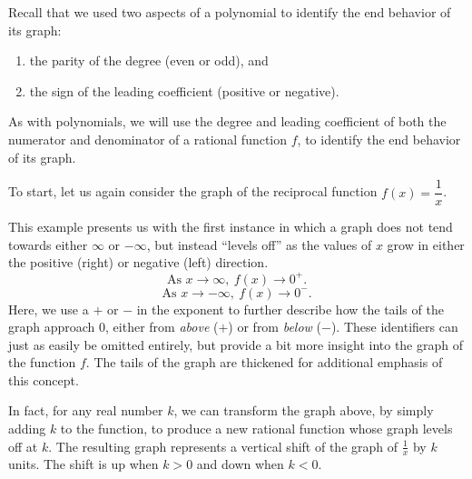 \documentclass[12pt]{book}
\theoremstyle{definition}
\begin{document}
Recall that we used two aspects of a polynomial to identify the end behavior of its graph:
\begin{enumerate}
	\item the parity of the degree (even or odd), and
	\item the sign of the leading coefficient (positive or negative).
\end{enumerate}
As with polynomials, we will use the degree and leading coefficient of both the numerator and denominator of a rational function $f$, to identify the end behavior of its graph.
\par
To start, let us again consider the graph of the reciprocal function $f(x)=\dfrac{1}{x}$.
\newpage
\begin{multicols}{2}

\columnbreak

This example presents us with the first instance in which a graph does not tend towards either $\infty$ or $-\infty$, but instead ``levels off'' as the values of $x$ grow in either the positive (right) or negative (left) direction.
$$\text{As } x\rightarrow\infty,\ f(x)\rightarrow 0^+.$$
$$\text{As } x\rightarrow-\infty,\ f(x)\rightarrow 0^-.$$
Here, we use a $+$ or $-$ in the exponent to further describe how the tails of the graph approach $0$, either from \textit{above} ($+$) or from \textit{below} ($-$).  These identifiers can just as easily be omitted entirely, but provide a bit more insight into the graph of the function $f$.  The tails of the graph are thickened for additional emphasis of this concept.
\end{multicols}
In fact, for any real number $k$, we can transform the graph above, by simply adding $k$ to the function, to produce a new rational function whose graph levels off at $k$.  The resulting graph represents a vertical shift of the graph of $\frac{1}{x}$ by $k$ units.  The shift is up when $k>0$ and down when $k<0$.  
\end{document}
